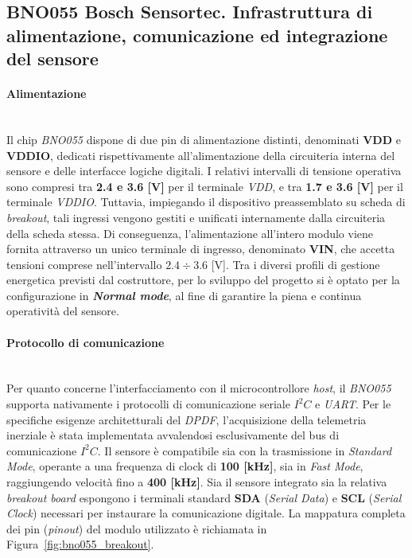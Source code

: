 \documentclass[11pt]{report}
\begin{document}
	\subsection{BNO055 Bosch Sensortec. Infrastruttura di alimentazione, comunicazione ed integrazione del sensore}
	
	\paragraph{Alimentazione}\mbox{}\\
	Il chip \textit{BNO055} dispone di due pin di alimentazione distinti, denominati \textbf{VDD} e \textbf{VDDIO}, dedicati rispettivamente all'alimentazione della circuiteria interna del sensore e delle interfacce logiche digitali. I relativi intervalli di tensione operativa sono compresi tra \textbf{2.4 e 3.6 [V]} per il terminale \textit{VDD}, e tra \textbf{1.7 e 3.6 [V]} per il terminale \textit{VDDIO}. Tuttavia, impiegando il dispositivo preassemblato su scheda di \textit{breakout}, tali ingressi vengono gestiti e unificati internamente dalla circuiteria della scheda stessa. Di conseguenza, l'alimentazione all'intero modulo viene fornita attraverso un unico terminale di ingresso, denominato \textbf{VIN}, che accetta tensioni comprese nell'intervallo $2.4 \div 3.6$ [V]. Tra i diversi profili di gestione energetica previsti dal costruttore, per lo sviluppo del progetto si è optato per la configurazione in \textbf{\textit{Normal mode}}, al fine di garantire la piena e continua operatività del sensore.
	
	\paragraph{Protocollo di comunicazione}\mbox{}\\
	Per quanto concerne l'interfacciamento con il microcontrollore \textit{host}, il \textit{BNO055} supporta nativamente i protocolli di comunicazione seriale $I^{2}C$ e \textit{UART}. Per le specifiche esigenze architetturali del \textit{DPDF}, l'acquisizione della telemetria inerziale è stata implementata avvalendosi esclusivamente del bus di comunicazione $I^{2}C$. Il sensore è compatibile sia con la trasmissione in \textit{Standard Mode}, operante a una frequenza di clock di \textbf{100 [kHz]}, sia in \textit{Fast Mode}, raggiungendo velocità fino a \textbf{400 [kHz]}. Sia il sensore integrato sia la relativa \textit{breakout board} espongono i terminali standard \textbf{SDA} (\textit{Serial Data}) e \textbf{SCL} (\textit{Serial Clock}) necessari per instaurare la comunicazione digitale. La mappatura completa dei pin (\textit{pinout}) del modulo utilizzato è richiamata in Figura~\ref{fig:bno055_breakout}.
	
\end{document}
